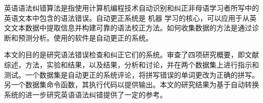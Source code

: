 \documentclass{standalone}
\begin{document}
	
\begin{chineseabstract}
英语语法纠错算法是指使用计算机编程技术自动识别和纠正非母语学习者所写中的英语文本中包含的语法错误。自动更正系统是 机器 学习的核心，可以应用于从英文文本数据中提取信息并构建可靠的语法校正方法。如何收集数据的方法是通过诊断和预测分析。使用的软件是自动更正的系统。

本文的目的是研究语法错误检查和纠正它们的系统。审查了四项研究概要，即文献综述，方法，实验和结果，以及结果，分析和讨论，并在两个数据集上进行指示和测试。一个数据集是自动更正的系统评论，将拼写错误的单词更改为正确的拼写。另一个数据集命令函数，其执行代码以提供输出。本文的研究结果为基于自动转换系统的进一步研究英语语法纠错提供了一定的参考。



\end{chineseabstract}
\end{document}
